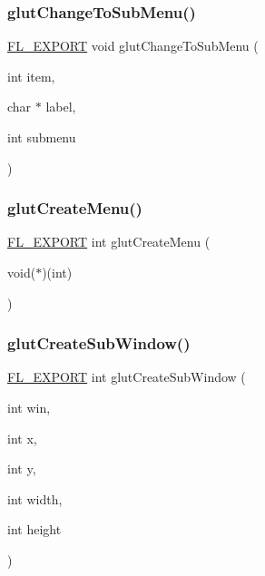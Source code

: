 \mbox{\label{glut_8_h_a37acacfd2a59bede6978695c2766c151}} 
\subsubsection{\texorpdfstring{glut\+Change\+To\+Sub\+Menu()}{glutChangeToSubMenu()}}
{\footnotesize\ttfamily \hyperlink{_fl___export_8_h_aa9ba29a18aee9d738370a06eeb4470fc}{F\+L\+\_\+\+E\+X\+P\+O\+RT} void glut\+Change\+To\+Sub\+Menu (\begin{DoxyParamCaption}\item[{int}]{item,  }\item[{char $\ast$}]{label,  }\item[{int}]{submenu }\end{DoxyParamCaption})}

\mbox{\label{glut_8_h_a93d2a94563c391a2cc301e019ca171d6}} 
\subsubsection{\texorpdfstring{glut\+Create\+Menu()}{glutCreateMenu()}}
{\footnotesize\ttfamily \hyperlink{_fl___export_8_h_aa9ba29a18aee9d738370a06eeb4470fc}{F\+L\+\_\+\+E\+X\+P\+O\+RT} int glut\+Create\+Menu (\begin{DoxyParamCaption}\item[{void($\ast$)(int)}]{ }\end{DoxyParamCaption})}

\mbox{\label{glut_8_h_a0cea2bd69dfa5bd25bd6c6d0d73762fe}} 
\subsubsection{\texorpdfstring{glut\+Create\+Sub\+Window()}{glutCreateSubWindow()}}
{\footnotesize\ttfamily \hyperlink{_fl___export_8_h_aa9ba29a18aee9d738370a06eeb4470fc}{F\+L\+\_\+\+E\+X\+P\+O\+RT} int glut\+Create\+Sub\+Window (\begin{DoxyParamCaption}\item[{int}]{win,  }\item[{int}]{x,  }\item[{int}]{y,  }\item[{int}]{width,  }\item[{int}]{height }\end{DoxyParamCaption})}

